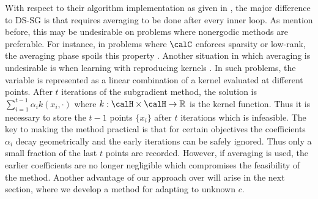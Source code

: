 \documentclass[smallextended]{svjour3}
\begin{document}
 With respect to their algorithm implementation as given in \cite[Algorithm 2]{yang2015rsg}, the major difference to DS-SG is that \cite{yang2015rsg} requires averaging to be done after every inner loop. As mention before, this may be undesirable on problems where nonergodic methods are preferable. For instance, in problems where $\calC$ enforces sparsity or low-rank, the averaging phase spoils this property \cite{davis2017three}. Another situation in which averaging is undesirable is when learning with reproducing kernels \cite{kivinen2004online}. In such problems, the variable is represented as a linear combination of a kernel evaluated at different points. After $t$ iterations of the subgradient method, the solution is $\sum_{i=1}^{t-1} \alpha_i k(x_i,\cdot)$ where $k:\calH\times\calH\to\mathbb{R}$ is the kernel function. Thus it is necessary to store the $t-1$ points $\{x_i\}$ after $t$ iterations which is infeasible. The key to making the method practical is that for certain objectives the coefficients $\alpha_i$ decay geometrically and the early iterations can be safely ignored. Thus only a small fraction of the last $t$ points are recorded. However, if averaging is used, the earlier coefficients are no longer negligible which compromises the feasibility of the method. Another advantage of our approach over \cite{yang2015rsg} will arise in the next section, where we develop a method for adapting to unknown $c$. 
 

 
\end{document}
